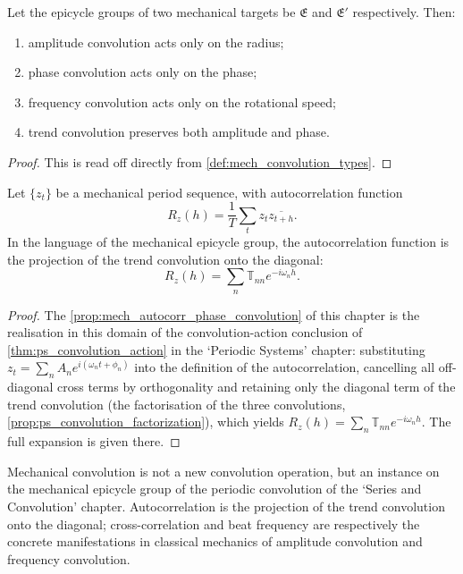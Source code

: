 \begin{theorem}\label{thm:mech_convolution_action}
Let the epicycle groups of two mechanical targets be $\mathfrak E$ and $\mathfrak E'$ respectively. Then:
\begin{enumerate}[label=(\roman*)]
    \item amplitude convolution acts only on the radius;
    \item phase convolution acts only on the phase;
    \item frequency convolution acts only on the rotational speed;
    \item trend convolution preserves both amplitude and phase.
\end{enumerate}
\end{theorem}

\begin{proof}
This is read off directly from \cref{def:mech_convolution_types}.
\end{proof}

\begin{proposition}\label{prop:mech_autocorr_phase_convolution}
Let $\{z_t\}$ be a mechanical period sequence, with autocorrelation function
\[
R_z(h)=\frac1T\sum_t z_t\overline{z_{t+h}}.
\]
In the language of the mechanical epicycle group, the autocorrelation function is the projection of the trend convolution onto the diagonal:
\[
R_z(h)=\sum_n\mathbb T_{nn}e^{-i\omega_n h}.
\]
\end{proposition}

\begin{proof}
The \cref{prop:mech_autocorr_phase_convolution} of this chapter is the realisation in this domain of the convolution-action conclusion of \cref{thm:ps_convolution_action} in the `Periodic Systems' chapter:
substituting $z_t=\sum_n A_n e^{i(\omega_n t+\phi_n)}$ into the definition of the autocorrelation, cancelling all off-diagonal cross terms by orthogonality and retaining only the diagonal term of the trend convolution
(the factorisation of the three convolutions, \cref{prop:ps_convolution_factorization}), which yields $R_z(h)=\sum_n\mathbb T_{nn}e^{-i\omega_n h}$.
The full expansion is given there.
\end{proof}

\begin{remark}\label{rem:mech_convolution_relation}
Mechanical convolution is not a new convolution operation, but an instance on the mechanical epicycle group of the periodic convolution of the `Series and Convolution' chapter. Autocorrelation is the projection of the trend convolution onto the diagonal; cross-correlation and beat frequency are respectively the concrete manifestations in classical mechanics of amplitude convolution and frequency convolution.
\end{remark}

